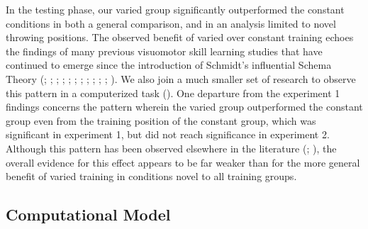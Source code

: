 \documentclass[
  11pt,
  letterpaper,
]{article}
\begin{document}
In the testing phase, our varied group significantly outperformed the
constant conditions in both a general comparison, and in an analysis
limited to novel throwing positions. The observed benefit of varied over
constant training echoes the findings of many previous visuomotor skill
learning studies that have continued to emerge since the introduction of
Schmidt's influential Schema Theory
(; ;
; ;
;
; ; ; ;
;
; ). We
also join a much smaller set of research to observe this pattern in a
computerized task (). One departure from the experiment 1 findings concerns the
pattern wherein the varied group outperformed the constant group even
from the training position of the constant group, which was significant
in experiment 1, but did not reach significance in experiment 2.
Although this pattern has been observed elsewhere in the literature
(; ), the overall evidence for this effect appears to be far weaker
than for the more general benefit of varied training in conditions novel
to all training groups.

\subsection{Computational Model}\label{computational-model}
\end{document}
